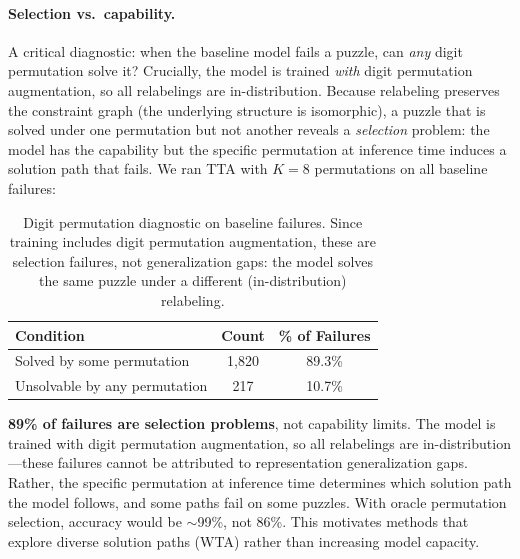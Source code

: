 \paragraph{Selection vs.\ capability.}
\label{sec:selection}
A critical diagnostic: when the
baseline model fails a puzzle, can \emph{any} digit permutation solve it?
Crucially, the model is trained \emph{with} digit permutation augmentation,
so all relabelings are in-distribution. Because relabeling preserves the
constraint graph (the underlying structure is isomorphic), a puzzle that is
solved under one permutation but not another reveals a \emph{selection}
problem: the model has the capability but the specific permutation at
inference time induces a solution path that fails. We ran TTA with $K{=}8$
permutations on all baseline failures:
%
\begin{table}[h]
\centering
\begin{tabular}{lcc}
\toprule
Condition & Count & \% of Failures \\
\midrule
Solved by some permutation & 1,820 & 89.3\% \\  %
Unsolvable by any permutation & 217 & 10.7\% \\  %
\bottomrule
\end{tabular}
\caption{Digit permutation diagnostic on baseline failures. Since training
includes digit permutation augmentation, these are selection failures, not
generalization gaps: the model solves the same puzzle under a different
(in-distribution) relabeling.}
\label{tab:selection-vs-capability}
\end{table}
%
\textbf{89\% of failures are selection problems}, not capability limits. The
model is trained with digit permutation augmentation, so all relabelings are
in-distribution---these failures cannot be attributed to representation
generalization gaps. Rather, the specific permutation at inference time
determines which solution path the model follows, and some paths fail on some
puzzles. With oracle permutation selection, accuracy would be ${\sim}$99\%,
not 86\%. This motivates methods that explore diverse solution paths (WTA)
rather than increasing model capacity.

